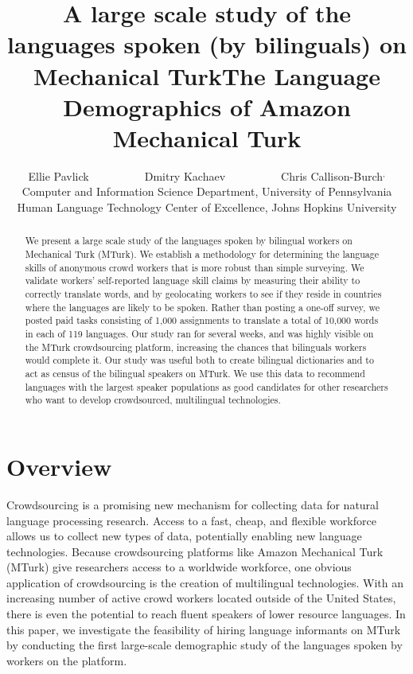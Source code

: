 \documentclass[11pt]{article}
\title{A large scale study of the languages spoken (by bilinguals) on Mechanical Turk}
\title{The Language Demographics of  Amazon Mechanical Turk}
\author{Ellie Pavlick\affliationPenn \ \ \ \ \ \ \ \ \ \ Dmitry Kachaev\affliationJHU \ \ \ \ \ \ \ \ \ \  Chris Callison-Burch\affliationPenn$^{,}$\affliationJHU \\
\affliationPenn Computer and Information Science Department, University of Pennsylvania \\
\affliationJHU Human Language Technology Center of Excellence, Johns Hopkins University \\
  }
\author{}
\date{}
\begin{document}
\maketitle

\begin{abstract}
We present a large scale study of the languages spoken by bilingual workers on Mechanical Turk (MTurk).  
We establish a  methodology for determining the language skills of anonymous crowd workers that is more robust than simple surveying.  We validate workers' self-reported language skill claims by measuring their ability to correctly translate words, and by geolocating workers to see if they reside in countries where the languages are likely to be spoken. Rather than posting a one-off survey, we posted paid tasks consisting of 1,000 assignments to translate a total of 10,000 words in each of 119 languages.  Our study ran for several weeks, and was highly visible on the MTurk crowdsourcing platform, increasing the chances that bilinguals workers would complete it.  Our study was useful both to create bilingual dictionaries and to act as census of the bilingual speakers on MTurk.  We use this data to recommend languages with the largest speaker populations as good candidates for other researchers who want to  develop crowdsourced, multilingual technologies.

\end{abstract}

\section{Overview}
Crowdsourcing is a promising new mechanism for collecting data for natural language processing research. Access to a fast, cheap, and flexible workforce allows us to collect new types of data, potentially enabling new language technologies.
Because crowdsourcing platforms like Amazon Mechanical Turk (MTurk) give researchers access to a worldwide workforce, one obvious application of crowdsourcing is the creation of multilingual technologies. 
With an increasing number of active crowd workers located outside of the United States, there is even the potential to reach fluent speakers of lower resource languages.
In this paper, we investigate the feasibility of hiring language informants on MTurk by conducting the first large-scale demographic study of the languages spoken by workers on the platform. 
\end{document}
